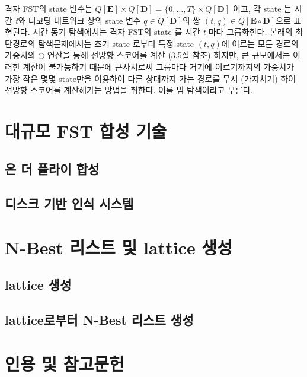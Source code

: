 \documentclass[../main.tex]{subfiles}
\begin{document}
격자 FST의 state 변수는 $ Q [ \bm{E} ] \times Q [ \bm{D} ] = \{ 0, \ldots , T\} \times Q [ \bm{D} ] $ 이고, 각 state 는 시간 \textit{t}와 디코딩 네트워크 상의 state 변수 $ q \in Q [ \bm{D} ] $의 쌍 $(t,q) \in Q [ \bm{E} \circ \bm{D} ] $으로 표현된다. 
시간 동기 탐색에서는 격자 FST의 state 를 시간 \textit{t} 마다 그룹화한다. 
본래의 최단경로의 탐색문제에서는 초기 state 로부터 특정 state $(t,q)$에 이르는 모든 경로의 가중치의 $\oplus$ 연산을 통해 전방향 스코어를 계산 (\hyperref[sec:shortest-path]{3.5절} 참조) 하지만, 
큰 규모에서는 이러한 계산이 불가능하기 때문에 근사치로써 그룹마다 거기에 이르기까지의 가중치가 가장 작은 몇몇 state만을 이용하여 다른 상태까지 가는 경로를 무시 (가지치기) 하여 전방향 스코어를 계산해가는 방법을 취한다. 
이를 빔 탐색이라고 부른다. 


\section{대규모 FST 합성 기술}
\subsection{온 더 플라이 합성}
\subsection{디스크 기반 인식 시스템}

\section{N-Best 리스트 및 lattice 생성}
\subsection{lattice 생성}
\subsection{lattice로부터 N-Best 리스트 생성}

\section*{인용 및 참고문헌}
\end{document}
